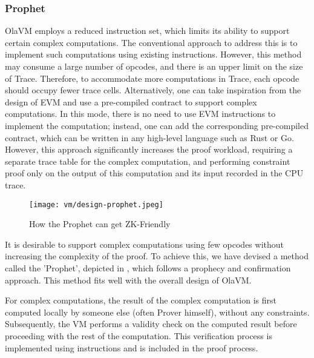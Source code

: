 \subsubsection{Prophet} \label{sec:design-prophet}

OlaVM employs a reduced instruction set, which limits its ability to support certain complex computations. The conventional approach to address this is to implement such computations using existing instructions. 
However, this method may consume a large number of opcodes, and there is an upper limit on the size of Trace. 
Therefore, to accommodate more computations in Trace, each opcode should occupy fewer trace cells. Alternatively, one can take inspiration from the design of EVM and use a pre-compiled contract to support complex computations. 
In this mode, there is no need to use EVM instructions to implement the computation; instead, one can add the corresponding pre-compiled contract, which can be written in any high-level language such as Rust or Go. 
However, this approach significantly increases the proof workload, requiring a separate trace table for the complex computation, and performing constraint proof only on the output of this computation and its input recorded in the CPU trace.

\begin{figure}[!ht]
    \centering
    \texttt{[image: vm/design-prophet.jpeg]}
    \caption{How the Prophet can get ZK-Friendly}
    \label{fig:design-prophet}
\end{figure}

It is desirable to support complex computations using few opcodes without increasing the complexity of the proof. 
To achieve this, we have devised a method called the 'Prophet', depicted in , 
which follows a prophecy and confirmation approach. This method fits well with the overall design of OlaVM.

For complex computations, the result of the complex computation is first computed locally by someone else (often Prover himself), without any constraints. 
Subsequently, the VM performs a validity check on the computed result before proceeding with the rest of the computation. 
This verification process is implemented using instructions and is included in the proof process.

